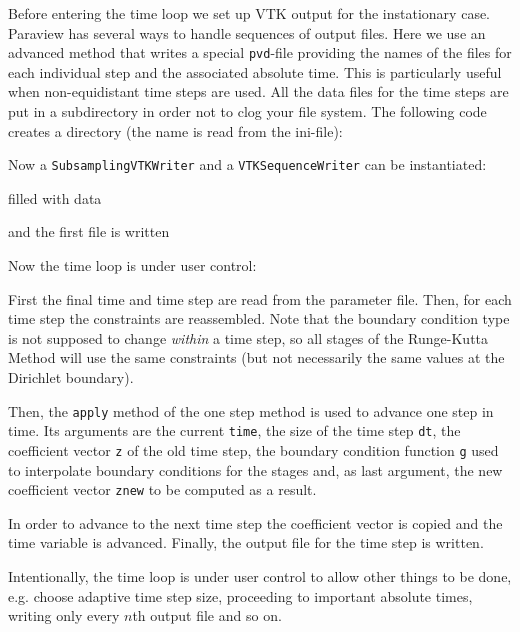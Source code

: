 \documentclass[a4paper,12pt]{article}
\begin{document}
Before entering the time loop we set up VTK output for the instationary case.
Paraview has several ways to handle sequences of output files. Here we use
an advanced method that writes a special \lstinline{pvd}-file providing the
names of the files for each individual step and the associated absolute time. This
is particularly useful when non-equidistant time steps are used. All the
data files for the time steps are put in a subdirectory in order not to clog your file system.
The following code creates a directory (the name is read from the ini-file):


Now a \lstinline{SubsamplingVTKWriter} and a \lstinline{VTKSequenceWriter}
can be instantiated:

filled with data

and the first file is written


Now the time loop is under user control:

First the final time and time step are read from the parameter
file. Then, for each time step the constraints are reassembled. Note that
the boundary condition type is not supposed to
change \textit{within} a time step, so all stages of the Runge-Kutta Method
will use the same constraints (but not necessarily the same values at the
Dirichlet boundary).

Then, the \lstinline{apply} method of the one step method is used to
advance one step in time. Its arguments are the current \lstinline{time}, the
size of the time step \lstinline{dt}, the coefficient vector \lstinline{z} of the old
time step, the boundary condition function \lstinline{g} used to interpolate
boundary conditions for the stages and, as last argument, the new coefficient
vector \lstinline{znew} to be computed as a result.

In order to advance to the next time step the coefficient vector is copied and the
time variable is advanced. Finally, the output file for the time step is written.

Intentionally, the time loop is under user control to allow other things to be done,
e.g. choose adaptive time step size, proceeding to important absolute times,
writing only  every $n$th output file and so on.
\end{document}
